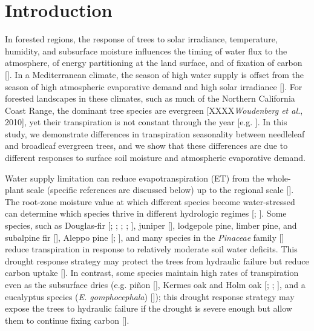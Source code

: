 \section{Introduction}
In forested regions, the response of trees to solar irradiance, temperature, humidity, and subsurface moisture influences the timing of water flux to the atmosphere, of energy partitioning at the land surface, and of fixation of carbon [\cite{bonan}]. In a Mediterranean climate, the season of high water supply is offset from the season of high atmospheric evaporative demand and high solar irradiance [\cite{baldocchi2007limits}]. For forested landscapes in these climates, such as much of the Northern California Coast Range, the dominant tree species are evergreen [XXXX\textit{Woudenberg et al.}, 2010], yet their transpiration is not constant through the year [e.g. \cite{vinukollu2010global}].  In this study, we demonstrate differences in transpiration seasonality between needleleaf and broadleaf evergreen trees, and we show that these differences are due to different responses to surface soil moisture and atmospheric evaporative demand.

Water supply limitation can reduce evapotranspiration (ET) from the whole-plant scale (specific references are discussed below) up to the regional scale [\cite{jung2010recent}].  The root-zone moisture value at which different species become water-stressed can determine which species thrive in different hydrologic regimes [\cite{rodriguez2001intensive}; \cite{kumagai2012strategies}].  Some species, such as Douglas-fir [\cite{granier1987evaluation}; \cite{tan1976factors}; \cite{black1979evapotranspiration}; \cite{humphreys2003annual}; \cite{jassal2009evapotranspiration}], juniper [\cite{mcdowell2008mechanisms}], lodgepole pine, limber pine, and subalpine fir [\cite{pataki2000sap}], Aleppo pine [\cite{baquedano2006comparative}; \cite{chirino2011daily}], and many species in the \textit{Pinaceae} family [\cite{martinez2004hydraulic}] reduce transpiration in response to relatively moderate soil water deficits.  This drought response strategy may protect the trees from hydraulic failure but reduce carbon uptake [\cite{mcdowell2008mechanisms}].  In contrast, some species maintain high rates of transpiration even as the subsurface dries (e.g. pi\~non [\cite{mcdowell2008mechanisms}], Kermes oak and Holm oak [\cite{baquedano2006comparative}; \cite{chirino2011daily}; \cite{david2007water}], and a eucalyptus species (\textit{E. gomphocephala}) [\cite{franks2007anisohydric}]); this drought response strategy may expose the trees to hydraulic failure if the drought is severe enough but allow them to continue fixing carbon [\cite{mcdowell2008mechanisms}]. 

